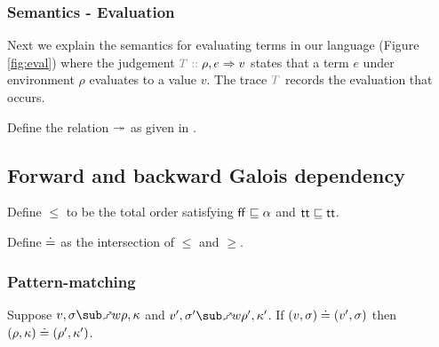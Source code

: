 \subsubsection{Semantics - Evaluation}
\label{ssec:core-semantics-eval}


Next we explain the semantics for evaluating terms in our language (Figure \ref{fig:eval}) where the judgement $\explVal{T}{\rho, e \evalR v}$ states that a term $e$ under environment $\rho$ evaluates to a value $v$. The trace $\textcolor{gray}{T}$ records the evaluation that occurs. 



\begin{definition}
   \label{def:core-language:closeDefs}
   Define the relation $\twoheadrightarrow$ as given in .
\end{definition}

\subsection{Forward and backward Galois dependency}
\label{ssec:core-fwd-bwd}



\begin{definition}
   Define $\leq$ to be the total order satisfying $\mathsf{ff} \sqsubseteq \alpha$ and $\mathsf{tt} \sqsubseteq \mathsf{tt}$.
\end{definition}

\begin{definition}
   Define $\doteq$ as the intersection of $\leq$ and $\geq$.
\end{definition}




\subsubsection{Pattern-matching}




\begin{lemma}
   Suppose $v, \sigma \matchFwdR{w} \rho, \kappa$ and $v', \sigma' \matchFwdR{w} \rho', \kappa'$. If $(v, \sigma) \doteq (v', \sigma)$ then $(\rho, \kappa) \doteq (\rho', \kappa')$.
\end{lemma}

